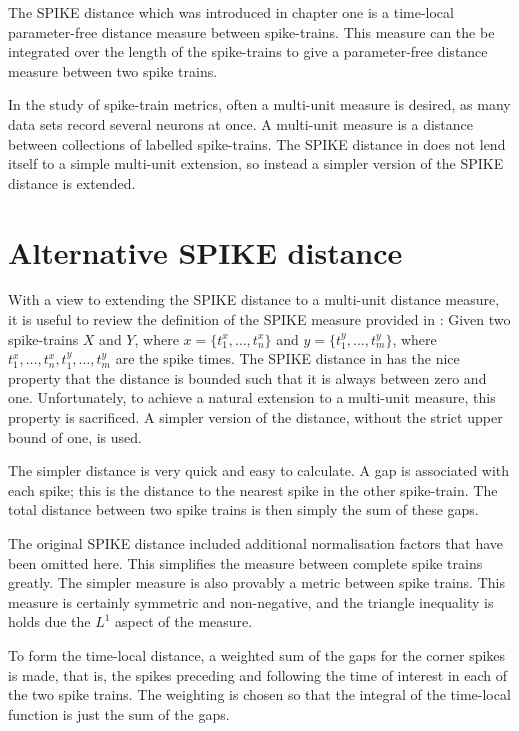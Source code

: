 The SPIKE distance \citep{KreuzEtAl2011a,KreuzEtAl2012a} which was introduced in chapter one is a time-local parameter-free distance measure between spike-trains.  This measure can the be integrated over the length of the spike-trains to give a parameter-free distance measure between two spike trains.  

In the study of spike-train metrics, often a multi-unit measure is desired, as many data sets record several neurons at once.  A multi-unit measure is a distance between collections of labelled spike-trains.  The SPIKE distance in \citep{KreuzEtAl2011a} does not lend itself to a simple multi-unit extension, so instead a simpler version of the SPIKE distance is extended.

\section{Alternative SPIKE distance}
With a view to extending the SPIKE distance to a multi-unit distance measure, it is useful to review the definition of the SPIKE measure provided in \citep{KreuzEtAl2011a}:  Given two spike-trains $X$ and $Y$, where $x = \{ t_1^x, \ldots, t_n^x \}$ and $y = \{ t_1^y, \ldots , t_m^y\}$, where $t_1^x,\ldots,t_n^x,t_1^y,\ldots,t_m^y$ are the spike times.  The SPIKE distance in \citep{KreuzEtAl2011a} has the nice property that the distance is bounded such that it is always between zero and one.  Unfortunately, to achieve a natural extension to a multi-unit measure, this property is sacrificed.  A simpler version of the distance, without the strict upper bound of one, is used.

The simpler distance is very quick and easy to calculate.  A gap is associated with each spike; this is the distance to the nearest spike in the other spike-train.  The total distance between two spike trains is then simply the sum of these gaps.  

The original SPIKE distance included additional normalisation factors that have been omitted here. This simplifies the measure between complete spike trains greatly. The simpler measure is also provably a metric between spike trains. This measure is certainly symmetric and non-negative, and the triangle inequality is holds due the $L^1$ aspect of the measure.

To form the time-local distance, a weighted sum of the gaps for the corner spikes is made, that is, the spikes preceding and following the time of interest in each of the two spike trains.  The weighting is chosen so that the integral of the time-local function is just the sum of the gaps.

